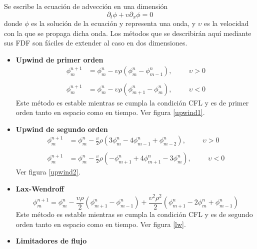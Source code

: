 \documentclass[11pt,twoside,openright,spanish]{report}
\numberwithin{equation}{chapter}
\numberwithin{figure}{chapter}
\numberwithin{table}{chapter}
\begin{document}
Se escribe la ecuación de advección en una dimensión
\begin{equation}
\partial_t\phi+\upsilon\partial_x \phi=0
\end{equation}
donde $\phi$ es la solución de la ecuación y representa una onda, y $\upsilon$ es la velocidad con la que se propaga dicha onda. Los métodos que se describirán aquí mediante sus FDF son fáciles de extender al caso en dos dimensiones.

\begin{itemize}
	\item \textbf{Upwind de primer orden}
	\begin{align}
	\phi^{n+1}_m&=\phi^n_m-\upsilon\rho\left(\phi_m^n-\phi^n_{m-1}\right),\hspace{1cm}\upsilon>0\\
	\nonumber
	&\\
	\phi^{n+1}_m&=\phi^n_m-\upsilon\rho\left(\phi_{m+1}^n-\phi^n_{m}\right),\hspace{1cm}\upsilon<0
	\end{align}
	Este método es estable mientras se cumpla la condición CFL y es de primer orden tanto en espacio como en tiempo. Ver figura \ref{upwind1}.
	
	\item \textbf{Upwind de segundo orden}
	\begin{align}
	\phi^{n+1}_m&=\phi^n_m-\frac{\upsilon}{2}\rho\left(3\phi_m^n-4\phi_{m-1}^n+\phi_{m-2}^n\right),\hspace{1cm}\upsilon>0\\
	\nonumber
	&\\
	\phi^{n+1}_m&=\phi^n_m-\frac{\upsilon}{2}\rho\left(-\phi_{m+1}^n+4\phi_{m+1}^n-3\phi_m^n\right),\hspace{1cm}\upsilon<0
	\end{align}
	Ver figura \ref{upwind2}.
	
	\item \textbf{Lax-Wendroff}
	\begin{equation}
	\phi^{n+1}_m=\phi^n_m-\frac{\upsilon \rho}{2}\left(\phi_{m+1}^n-\phi_{m-1}^n\right)+\frac{\upsilon^2\rho^2}{2}\left(\phi^n_{m+1}-2\phi^n_m+\phi^n_{m-1}\right)
	\end{equation}
	Este método es estable mientras se cumpla la condición CFL y es de segundo orden tanto en espacio como en tiempo. Ver figura \ref{lw}.
	
	\newpage
	\item \textbf{Limitadores de flujo}
	

\end{itemize}
\end{document}
